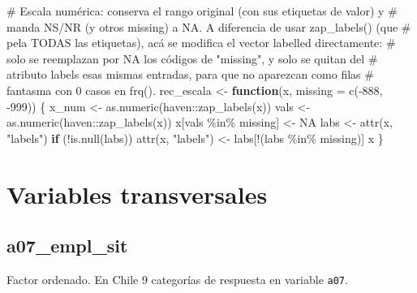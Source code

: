 \documentclass[
  letterpaper,
  DIV=11,
  numbers=noendperiod]{scrreprt}
\newenvironment{Shaded}{\begin{snugshade}}{\end{snugshade}}
\newcommand{\AttributeTok}[1]{\textcolor[rgb]{0.40,0.45,0.13}{#1}}
\newcommand{\CommentTok}[1]{\textcolor[rgb]{0.37,0.37,0.37}{#1}}
\newcommand{\ConstantTok}[1]{\textcolor[rgb]{0.56,0.35,0.01}{#1}}
\newcommand{\ControlFlowTok}[1]{\textcolor[rgb]{0.00,0.23,0.31}{\textbf{#1}}}
\newcommand{\DecValTok}[1]{\textcolor[rgb]{0.68,0.00,0.00}{#1}}
\newcommand{\FunctionTok}[1]{\textcolor[rgb]{0.28,0.35,0.67}{#1}}
\newcommand{\NormalTok}[1]{\textcolor[rgb]{0.00,0.23,0.31}{#1}}
\newcommand{\OtherTok}[1]{\textcolor[rgb]{0.00,0.23,0.31}{#1}}
\newcommand{\SpecialCharTok}[1]{\textcolor[rgb]{0.37,0.37,0.37}{#1}}
\newcommand{\StringTok}[1]{\textcolor[rgb]{0.13,0.47,0.30}{#1}}
\begin{document}
\begin{Shaded}
\begin{Highlighting}[]
\CommentTok{\# Escala numérica: conserva el rango original (con sus etiquetas de valor) y}
\CommentTok{\# manda NS/NR (y otros missing) a NA. A diferencia de usar zap\_labels() (que}
\CommentTok{\# pela TODAS las etiquetas), acá se modifica el vector labelled directamente:}
\CommentTok{\# solo se reemplazan por NA los códigos de "missing", y solo se quitan del}
\CommentTok{\# atributo \textasciigrave{}labels\textasciigrave{} esas mismas entradas, para que no aparezcan como filas}
\CommentTok{\# fantasma con 0 casos en frq().}
\NormalTok{rec\_escala }\OtherTok{\textless{}{-}} \ControlFlowTok{function}\NormalTok{(x, }\AttributeTok{missing =} \FunctionTok{c}\NormalTok{(}\SpecialCharTok{{-}}\DecValTok{888}\NormalTok{, }\SpecialCharTok{{-}}\DecValTok{999}\NormalTok{)) \{}
\NormalTok{  x\_num }\OtherTok{\textless{}{-}} \FunctionTok{as.numeric}\NormalTok{(haven}\SpecialCharTok{::}\FunctionTok{zap\_labels}\NormalTok{(x))}
\NormalTok{  vals }\OtherTok{\textless{}{-}} \FunctionTok{as.numeric}\NormalTok{(haven}\SpecialCharTok{::}\FunctionTok{zap\_labels}\NormalTok{(x))}
\NormalTok{  x[vals }\SpecialCharTok{\%in\%}\NormalTok{ missing] }\OtherTok{\textless{}{-}} \ConstantTok{NA}
\NormalTok{  labs }\OtherTok{\textless{}{-}} \FunctionTok{attr}\NormalTok{(x, }\StringTok{"labels"}\NormalTok{)}
  \ControlFlowTok{if}\NormalTok{ (}\SpecialCharTok{!}\FunctionTok{is.null}\NormalTok{(labs)) }\FunctionTok{attr}\NormalTok{(x, }\StringTok{"labels"}\NormalTok{) }\OtherTok{\textless{}{-}}\NormalTok{ labs[}\SpecialCharTok{!}\NormalTok{(labs }\SpecialCharTok{\%in\%}\NormalTok{ missing)]}
\NormalTok{  x}
\NormalTok{\}}
\end{Highlighting}
\end{Shaded}

\section{Variables transversales}\label{variables-transversales}

\subsection{a07\_empl\_sit}\label{a07_empl_sit}

Factor ordenado. En Chile 9 categorías de respuesta en variable
\texttt{a07}.
\end{document}
